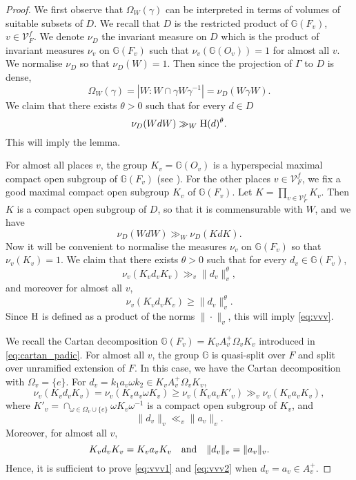 \documentclass[11pt,reqno,a4paper]{amsart}
\numberwithin{equation}{section}
\newcommand{\bG}{\mathbb{G}}
\theoremstyle{theorem}
\theoremstyle{definition}
\begin{document}
\begin{proof}
We first observe that $\Omega_W(\gamma)$ can be interpreted in terms of volumes
of suitable subsets of $D$. We recall that $D$ is the restricted product of $\bG(F_v)$, $v\in \mathcal{V}^f_F$. We denote $\nu_D$ the invariant measure on $D$ which is the product of 
invariant measures $\nu_v$ on $\bG(F_v)$ such that $\nu_v(\bG(O_v))=1$ for almost all $v$.
We normalise $\nu_D$ so that $\nu_D(W)=1$. Then
since the projection of $\Gamma$ to $D$ is dense,
\[
\Omega_W(\gamma)= |W : W\cap\gamma W \gamma^{-1}| = \nu_D(W\gamma W).
\]
We claim that there exists $\theta>0$ such that for every $d\in D$
\begin{equation}\label{eq:vvv}
\nu_D(WdW) \gg_W \hbox{H}(d)^\theta.
\end{equation}
This will imply the lemma.
	
For almost all places $v$, the group $K_v=\bG(O_v)$ is a hyperspecial maximal compact open subgroup 
of $\bG(F_v)$ (see \cite{Ti}). For the other places $v\in \mathcal{V}_F^f$, 
we fix a good maximal compact open subgroup $K_v$ of $\bG(F_v)$.
Let $K=\prod_{v\in \mathcal{V}^f_F} K_v$. Then $K$ is a compact open subgroup of $D$,
so that it is commensurable with $W$, and we have 
$$
\nu_D(WdW)\gg_W \nu_D(KdK).
$$
Now it will be convenient to normalise the measures $\nu_v$ on $\bG(F_v)$ so that $\nu_v(K_v)=1$.
We claim that there exists $\theta>0$ such that for every $d_v\in \bG(F_v)$,
\begin{equation}\label{eq:vvv1}
\nu_v(K_vd_vK_v)\gg_v \|d_v\|_v^\theta,
\end{equation}
and moreover for almost all $v$,
\begin{equation}\label{eq:vvv2}
\nu_v(K_vd_vK_v)\ge \|d_v\|_v^\theta.
\end{equation}
Since $\hbox{H}$ is defined as a product of the norms $\|\cdot \|_v$, this will imply \eqref{eq:vvv}.

We recall the Cartan decomposition $\bG(F_v)=K_vA_v^+\Omega_v K_v$ introduced in \eqref{eq:cartan_padic}. For almost all $v$, the group $\bG$ is quasi-split over $F$
and split over unramified extension of $F$. In this case, we have the Cartan decomposition
with $\Omega_v=\{e\}$. 
For $d_v=k_1a_v\omega k_2\in K_vA_v^+\Omega_v K_v$,
$$
\nu_v(K_vd_vK_v)=\nu_v(K_va_v \omega K_v)\ge \nu_v(K_va_vK'_v)\gg_v  \nu_v(K_va_vK_v),
$$
where $K'_v=\cap_{\omega\in\Omega_v\cup\{e\}} \omega K_v \omega^{-1}$
is a compact open subgroup of $K_v$, and 
$$
\|d_v\|_v\ll_v \|a_v\|_v.
$$
Moreover, for almost all $v$,
$$
K_vd_vK_v=K_va_vK_v\quad\hbox{and}\quad \|d_v\|_v = \|a_v\|_v.
$$
Hence, it is sufficient to prove \eqref{eq:vvv1} and \eqref{eq:vvv2} when $d_v=a_v\in A_v^+$.


\end{proof}
\end{document}
